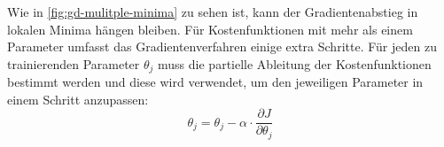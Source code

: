 \noindent
Wie in \autoref{fig:gd-mulitple-minima} zu sehen ist, kann
der Gradientenabstieg in lokalen Minima hängen bleiben.
Für Kostenfunktionen mit mehr als einem Parameter
umfasst das Gradientenverfahren einige extra Schritte.
Für jeden zu trainierenden Parameter $\theta_{j}$ muss die
partielle Ableitung der Kostenfunktionen bestimmt werden
und diese wird verwendet, um den jeweiligen Parameter in einem Schritt anzupassen:
\begin{equation}
  \theta_{j} = \theta_j - \alpha \cdot \frac{\partial J}{\partial \theta_j}
\end{equation}

